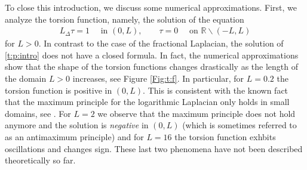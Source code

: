 \documentclass[11 pt]{article}
\numberwithin{equation}{section}
\def\R{\mathbb{R}}
\begin{document}
To close this introduction, we discuss some numerical approximations.  First, we analyze the torsion function, namely, the solution of the equation
\begin{align}\label{t:p:intro}
 L_\Delta \tau = 1\quad \text{ in }(0,L),\qquad \tau=0\quad \text{ on }\R\backslash (-L,L)
\end{align}
for $L>0$.  In contrast to the case of the fractional Laplacian, the solution of \eqref{t:p:intro} does not have a closed formula. In fact, the numerical approximations show that the shape of the torsion functions changes drastically as the length of the domain $L>0$ increases, see Figure \ref{Fig:t:f}. In particular, for $L=0.2$ the torsion function is positive in $(0,L)$.  This is consistent with the known fact that the maximum principle for the logarithmic Laplacian only holds in small domains, see \cite[Corollary 1.9]{CW19}. For $L=2$ we observe that the maximum principle does not hold anymore and the solution is \emph{negative} in $(0,L)$ (which is sometimes referred to as an antimaximum principle) and for $L=16$ the torsion function exhbits oscillations and changes sign. These last two phenomena have not been described theoretically so far.
\end{document}

